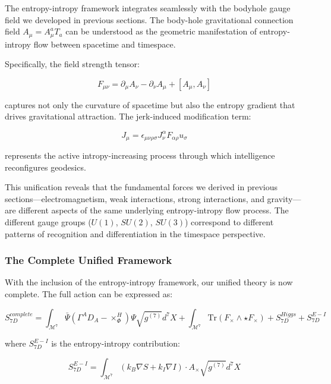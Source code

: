 \documentclass{article}
\begin{document}
The entropy-intropy framework integrates seamlessly with the bodyhole gauge field we developed in previous sections. The body-hole gravitational connection field $A_\mu = A_\mu^a T_a$ can be understood as the geometric manifestation of entropy-intropy flow between spacetime and timespace.

Specifically, the field strength tensor:

\begin{equation}
F_{\mu\nu} = \partial_\mu A_\nu - \partial_\nu A_\mu + [A_\mu, A_\nu]
\end{equation}

captures not only the curvature of spacetime but also the entropy gradient that drives gravitational attraction. The jerk-induced modification term:

\begin{equation}
J_\mu = \epsilon_{\mu\nu\rho\sigma} J_\nu^{\alpha} F_{\alpha\rho} u_\sigma
\end{equation}

represents the active intropy-increasing process through which intelligence reconfigures geodesics.

This unification reveals that the fundamental forces we derived in previous sections—electromagnetism, weak interactions, strong interactions, and gravity—are different aspects of the same underlying entropy-intropy flow process. The different gauge groups ($U(1)$, $SU(2)$, $SU(3)$) correspond to different patterns of recognition and differentiation in the timespace perspective.

\subsubsection{The Complete Unified Framework}

With the inclusion of the entropy-intropy framework, our unified theory is now complete. The full action can be expressed as:

\begin{equation}
S_{7D}^{complete} = \int_{\mathcal{M}^7} \bar{\Psi} (\Gamma^A D_A - \times_\Phi^H) \Psi \sqrt{g^{(7)}} d^7X + \int_{\mathcal{M}^7} \text{Tr}(F_{\times} \wedge \star F_{\times}) + S_{7D}^{Higgs} + S_{7D}^{E-I}
\end{equation}

where $S_{7D}^{E-I}$ is the entropy-intropy contribution:

\begin{equation}
S_{7D}^{E-I} = \int_{\mathcal{M}^7} \left(k_B \nabla S + k_I \nabla I\right) \cdot A_{\times} \sqrt{g^{(7)}} d^7X
\end{equation}
\end{document}
